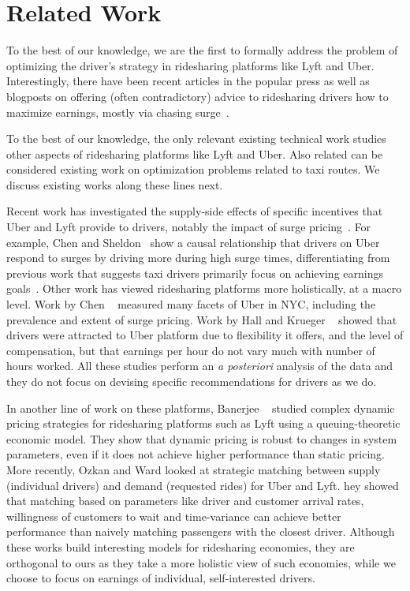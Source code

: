 
\section{Related Work}
\label{sec:related_work}

To the best of our knowledge, we are the first to formally address the problem of optimizing
the driver's strategy in ridesharing platforms like Lyft and Uber. 
Interestingly, there have been recent articles in the popular press as well as blogposts on 
offering (often contradictory) advice to ridesharing drivers how to maximize earnings, mostly via chasing surge~\cite{dont,tips}.

To the best of our knowledge, the only relevant existing technical work 
studies other aspects of ridesharing platforms like Lyft and Uber. 
Also related can be considered existing work on optimization problems related to taxi routes. We discuss existing works along these lines next.


Recent work has investigated the supply-side effects of specific incentives that Uber and Lyft provide to drivers, notably the impact of surge pricing~\cite{slaves}.  For example, Chen and Sheldon~\cite{chen2016dynamic} show 
a causal relationship that drivers on Uber respond to surges by driving more during high surge times,  differentiating from previous work that suggests taxi drivers primarily focus on achieving earnings goals~\cite{camerer1997labor}. 
Other work has viewed ridesharing platforms more holistically, at a macro level.
Work by Chen {\etal}~\cite{chen2015peeking} measured many facets of Uber in NYC, including the prevalence and extent 
  of surge pricing.
Work by Hall and Krueger {\etal}~\cite{hall2016analysis} showed that drivers were attracted to Uber platform due to flexibility it offers, 
and the level of compensation, but that earnings per hour do not vary much with number of hours worked. 
All these studies perform an {\em a posteriori} analysis of the data
and they do not focus on devising specific recommendations for drivers as we do.


 In another line of work on these platforms, Banerjee {\etal}~\cite{banerjee2015pricing} studied complex dynamic
pricing strategies for ridesharing platforms such as Lyft using a queuing-theoretic economic model. 
They show that dynamic pricing is robust to changes in system parameters, even if it does not 
  achieve higher performance than static pricing.  
More recently, Ozkan and Ward\cite{ozkan2016dynamic} looked at strategic matching between supply (individual drivers) 
  and demand (requested rides) for Uber and Lyft.
 hey showed that matching based on parameters like driver and customer arrival rates, 
  willingness of customers to wait and time-variance can achieve better performance than naively matching 
  passengers with the closest driver. 
Although these works build interesting models for ridesharing economies, they are
 orthogonal to ours as they take a more holistic view of such economies, while we choose to focus 
 on earnings of individual, self-interested drivers.




